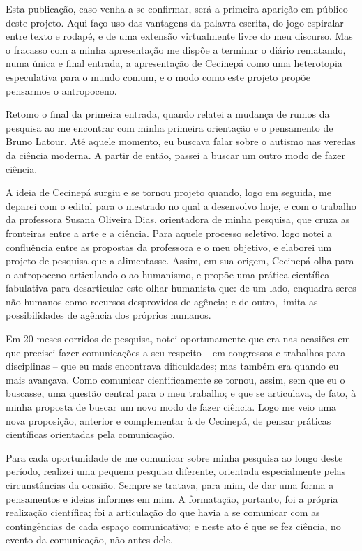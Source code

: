Esta publicação, caso venha a se confirmar, será a primeira aparição em público deste projeto. Aqui faço uso das vantagens da palavra escrita, do jogo espiralar entre texto e rodapé, e de uma extensão virtualmente livre do meu discurso. Mas o fracasso com a minha apresentação me dispõe a terminar o diário rematando, numa única e final entrada, a apresentação de Cecinepá como uma heterotopia especulativa para o mundo comum, e o modo como este projeto propõe pensarmos o antropoceno.

Retomo o final da primeira entrada, quando relatei a mudança de rumos da pesquisa ao me encontrar com minha primeira orientação e o pensamento de Bruno Latour. Até aquele momento, eu buscava falar sobre o autismo nas veredas da ciência moderna. A partir de então, passei a buscar um outro modo de fazer ciência.


A ideia de Cecinepá surgiu e se tornou projeto quando, logo em seguida, me deparei com o edital para o mestrado no qual a desenvolvo hoje, e com o trabalho da professora Susana Oliveira Dias, orientadora de minha pesquisa, que cruza as fronteiras entre a arte e a ciência. Para aquele processo seletivo, logo notei a confluência entre as propostas da professora e o meu objetivo, e elaborei um projeto de pesquisa que a alimentasse. Assim, em sua origem, Cecinepá olha para o antropoceno articulando-o ao humanismo, e propõe uma prática científica fabulativa para desarticular este olhar humanista que: de um lado, enquadra seres não-humanos como recursos desprovidos de agência; e de outro, limita as possibilidades de agência dos próprios humanos.

Em 20 meses corridos de pesquisa, notei oportunamente que era nas ocasiões em que precisei fazer comunicações a seu respeito -- em congressos e trabalhos para disciplinas -- que eu mais encontrava dificuldades; mas também era quando eu mais avançava. Como comunicar cientificamente se tornou, assim, sem que eu o buscasse, uma questão central para o meu trabalho; e que se articulava, de fato, à minha proposta de buscar um novo modo de fazer ciência. Logo me veio uma nova proposição, anterior e complementar à de Cecinepá, de pensar práticas científicas orientadas pela comunicação.

Para cada oportunidade de me comunicar sobre minha pesquisa ao longo deste período, realizei uma pequena pesquisa diferente, orientada especialmente pelas circunstâncias da ocasião. Sempre se tratava, para mim, de dar uma forma a pensamentos e ideias informes em mim. A formatação, portanto, foi a própria realização científica; foi a articulação do que havia a se comunicar com as contingências de cada espaço comunicativo; e neste ato é que se fez ciência, no evento da comunicação, não antes dele.

